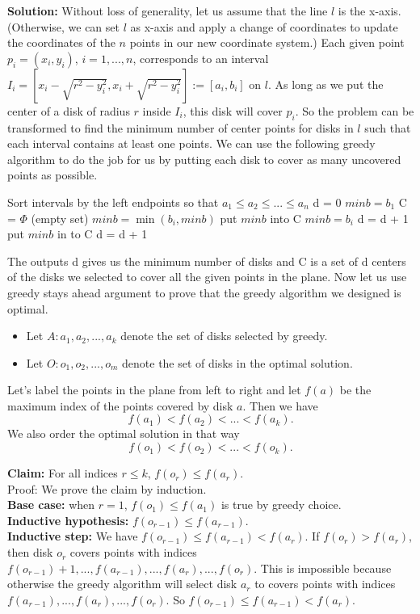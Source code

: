 \documentclass{article}
\begin{document}
\begin{tcolorbox}
\textbf{Solution:} Without loss of generality, let us assume that the line $l$ is the x-axis. (Otherwise, we can set $l$ as x-axis and apply a change of coordinates to update the coordinates of the $n$ points in our new coordinate system.) Each given point $p_i = (x_i, y_i)$, $i = 1, ..., n$, corresponds to an interval $I_i = [x_i - \sqrt{r^2 - y_i^2}, x_i +\sqrt{r^2 - y_i^2}] := [a_i, b_i]$ on $l$. As long as we put the center of a disk of radius $r$ inside $I_i$, this disk will cover $p_i$. So the problem can be transformed to find the minimum number of center points for disks in $l$ such that each interval contains at least one points. We can use the following greedy algorithm to do the job for us by putting each disk to cover as many uncovered points as possible.\\
\begin{algorithm}[H]
			\SetAlgoLined
			Sort intervals by the left endpoints so that $a_1 \leq a_2 \leq ... \leq a_n$\;
			d = 0\;
			$minb = b_1$\;
			C = $\Phi$ (empty set)\;
			 {
			                  {$minb = \min (b_i,  minb)$}
			                  {put $minb$ into C \;
			                  $minb = b_i$ \;
			                   d = d + 1\;
			                  }	
			                  {put $minb$ in to C\;
			                  d = d + 1
			                  }			
			}
		\end{algorithm}	
The outputs d gives us the minimum number of disks and C is a set of d centers of the disks we selected to cover all the given points in the plane. Now let us use greedy stays ahead argument to prove that the greedy algorithm we designed is optimal. 
\begin{itemize}
\item Let $A: a_1, a_2, ..., a_k$ denote the set of disks selected by greedy.
\item Let $O: o_1, o_2, ..., o_m$ denote the set of disks in the optimal solution.
\end{itemize}
Let's label the points in the plane from left to right and let $f(a)$ be the maximum index of the points covered by disk $a$. Then we have 
$$f(a_1) < f(a_2) < ... < f(a_k).$$ We also order the optimal solution in that way $$f(o_1) < f(o_2) < ... < f(o_k).$$

\textbf{Claim:} For all indices $r \leq k$, $f(o_r) \leq f(a_r)$.\\
Proof: We prove the claim by induction. \\
\textbf{Base case:} when $r = 1$, $f(o_1) \leq f(a_1)$ is true by greedy choice.\\
\textbf{Inductive hypothesis:} $f(o_{r-1}) \leq f(a_{r-1})$.\\
\textbf{Inductive step:} We have $f(o_{r-1}) \leq f(a_{r-1}) < f(a_r)$. If $f(o_r) > f(a_r)$, then disk $o_r$ covers points with indices $f(o_{r-1})+1, ..., f(a_{r-1}), ..., f(a_r), ..., f(o_r)$. This is impossible because otherwise the greedy algorithm will select disk $a_r$ to covers points with indices $f(a_{r-1}), ..., f(a_r), ..., f(o_r)$. So $f(o_{r-1}) \leq f(a_{r-1}) < f(a_r)$.\\


\end{tcolorbox}
\end{document}
